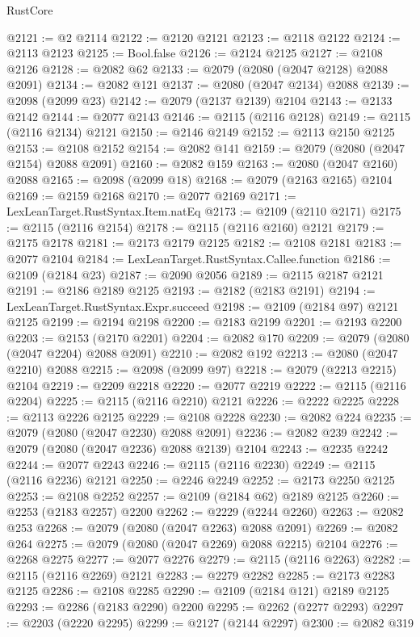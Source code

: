 \begin{lexlean}{RustCore}
\begin{coremodule}
@2121 := @2 @2114
@2122 := @2120 @2121
@2123 := @2118 @2122
@2124 := @2113 @2123
@2125 := Bool.false
@2126 := @2124 @2125
@2127 := @2108 @2126
@2128 := @2082 @62
@2133 := @2079 (@2080 (@2047 @2128) @2088 @2091)
@2134 := @2082 @121
@2137 := @2080 (@2047 @2134) @2088
@2139 := @2098 (@2099 @23)
@2142 := @2079 (@2137 @2139) @2104
@2143 := @2133 @2142
@2144 := @2077 @2143
@2146 := @2115 (@2116 @2128)
@2149 := @2115 (@2116 @2134) @2121
@2150 := @2146 @2149
@2152 := @2113 @2150 @2125
@2153 := @2108 @2152
@2154 := @2082 @141
@2159 := @2079 (@2080 (@2047 @2154) @2088 @2091)
@2160 := @2082 @159
@2163 := @2080 (@2047 @2160) @2088
@2165 := @2098 (@2099 @18)
@2168 := @2079 (@2163 @2165) @2104
@2169 := @2159 @2168
@2170 := @2077 @2169
@2171 := LexLeanTarget.RustSyntax.Item.natEq
@2173 := @2109 (@2110 @2171)
@2175 := @2115 (@2116 @2154)
@2178 := @2115 (@2116 @2160) @2121
@2179 := @2175 @2178
@2181 := @2173 @2179 @2125
@2182 := @2108 @2181
@2183 := @2077 @2104
@2184 := LexLeanTarget.RustSyntax.Callee.function
@2186 := @2109 (@2184 @23)
@2187 := @2090 @2056
@2189 := @2115 @2187 @2121
@2191 := @2186 @2189 @2125
@2193 := @2182 (@2183 @2191)
@2194 := LexLeanTarget.RustSyntax.Expr.succeed
@2198 := @2109 (@2184 @97) @2121 @2125
@2199 := @2194 @2198
@2200 := @2183 @2199
@2201 := @2193 @2200
@2203 := @2153 (@2170 @2201)
@2204 := @2082 @170
@2209 := @2079 (@2080 (@2047 @2204) @2088 @2091)
@2210 := @2082 @192
@2213 := @2080 (@2047 @2210) @2088
@2215 := @2098 (@2099 @97)
@2218 := @2079 (@2213 @2215) @2104
@2219 := @2209 @2218
@2220 := @2077 @2219
@2222 := @2115 (@2116 @2204)
@2225 := @2115 (@2116 @2210) @2121
@2226 := @2222 @2225
@2228 := @2113 @2226 @2125
@2229 := @2108 @2228
@2230 := @2082 @224
@2235 := @2079 (@2080 (@2047 @2230) @2088 @2091)
@2236 := @2082 @239
@2242 := @2079 (@2080 (@2047 @2236) @2088 @2139) @2104
@2243 := @2235 @2242
@2244 := @2077 @2243
@2246 := @2115 (@2116 @2230)
@2249 := @2115 (@2116 @2236) @2121
@2250 := @2246 @2249
@2252 := @2173 @2250 @2125
@2253 := @2108 @2252
@2257 := @2109 (@2184 @62) @2189 @2125
@2260 := @2253 (@2183 @2257) @2200
@2262 := @2229 (@2244 @2260)
@2263 := @2082 @253
@2268 := @2079 (@2080 (@2047 @2263) @2088 @2091)
@2269 := @2082 @264
@2275 := @2079 (@2080 (@2047 @2269) @2088 @2215) @2104
@2276 := @2268 @2275
@2277 := @2077 @2276
@2279 := @2115 (@2116 @2263)
@2282 := @2115 (@2116 @2269) @2121
@2283 := @2279 @2282
@2285 := @2173 @2283 @2125
@2286 := @2108 @2285
@2290 := @2109 (@2184 @121) @2189 @2125
@2293 := @2286 (@2183 @2290) @2200
@2295 := @2262 (@2277 @2293)
@2297 := @2203 (@2220 @2295)
@2299 := @2127 (@2144 @2297)
@2300 := @2082 @319

\end{coremodule}
\end{lexlean}

